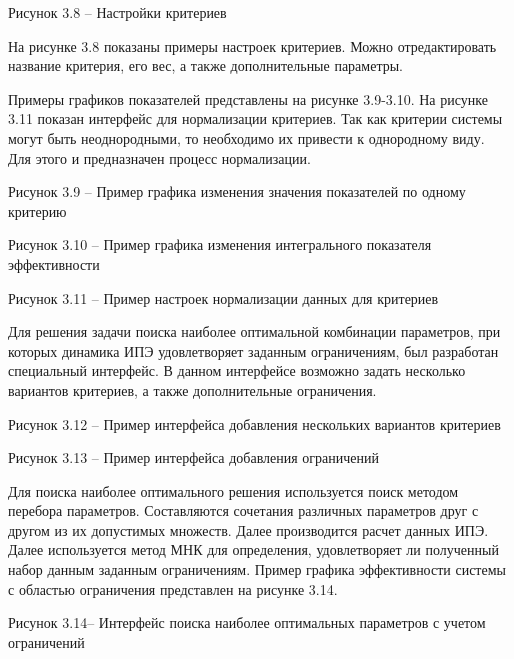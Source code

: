 Рисунок 3.8 – Настройки критериев

На рисунке 3.8 показаны примеры настроек критериев. 
Можно отредактировать название критерия, его вес, а также дополнительные параметры.

Примеры графиков показателей представлены на рисунке 3.9-3.10.
На рисунке 3.11 показан интерфейс для нормализации критериев. 
Так как критерии системы могут быть неоднородными, то необходимо их привести к однородному виду. 
Для этого и предназначен процесс нормализации. 


Рисунок 3.9 – Пример графика изменения значения показателей по одному критерию

Рисунок 3.10 – Пример графика изменения интегрального показателя эффективности

Рисунок 3.11 – Пример настроек нормализации данных для критериев

Для решения задачи поиска наиболее оптимальной комбинации параметров, при которых динамика ИПЭ удовлетворяет заданным ограничениям, был разработан специальный интерфейс. 
В данном интерфейсе возможно задать несколько вариантов критериев, а также дополнительные ограничения.

Рисунок 3.12 – Пример интерфейса добавления нескольких вариантов критериев

Рисунок 3.13 – Пример интерфейса добавления ограничений

Для поиска наиболее оптимального решения используется поиск методом перебора параметров. 
Составляются сочетания различных параметров друг с другом из их допустимых множеств. 
Далее производится расчет данных ИПЭ. Далее используется метод МНК для определения, удовлетворяет ли полученный набор данным заданным ограничениям.
Пример графика эффективности системы с областью ограничения представлен на рисунке 3.14.

Рисунок 3.14– Интерфейс поиска наиболее оптимальных параметров с учетом ограничений





